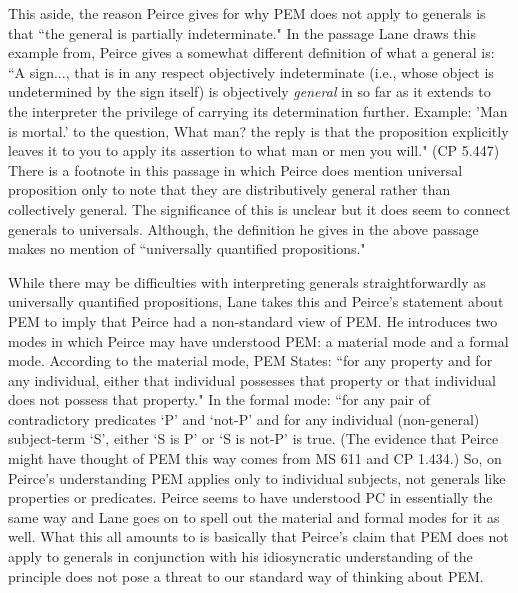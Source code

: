 \documentclass[12pt]{article}
\begin{document}
This aside, the reason Peirce gives for why PEM does not apply to generals is that ``the general is partially indeterminate." In the passage Lane draws this example from, Peirce gives a somewhat different definition of what a general is: ``A sign..., that is in any respect objectively indeterminate (i.e., whose object is undetermined by the sign itself) is objectively \textit{general} in so far as it extends to the interpreter the privilege of carrying its determination further. Example: 'Man is mortal.' to the question, What man? the reply is that the proposition explicitly leaves it to you to apply its assertion to what man or men you will." (CP 5.447) There is a footnote in this passage in which Peirce does mention universal proposition only to note that they are distributively general rather than collectively general. The significance of this is unclear but it does seem to connect generals to universals. Although, the definition he gives in the above passage makes no mention of ``universally quantified propositions." 

While there may be difficulties with interpreting generals straightforwardly as universally quantified propositions, Lane takes this and Peirce's statement about PEM to imply that Peirce had a non-standard view of PEM. He introduces two modes in which Peirce may have understood PEM: a material mode and a formal mode. According to the material mode, PEM States: ``for any property and for any individual, either that individual possesses that property or that individual does not possess that property." In the formal mode: ``for any pair of contradictory predicates `P' and `not-P' and for any individual (non-general) subject-term `S', either `S is P' or `S is not-P' is true. (The evidence that Peirce might have thought of PEM this way comes from MS 611 and CP 1.434.) So, on Peirce's understanding PEM applies only to individual subjects, not generals like properties or predicates. Peirce seems to have understood PC in essentially the same way and Lane goes on to spell out the material and formal modes for it as well. What this all amounts to is basically that Peirce's claim that PEM does not apply to generals in conjunction with his idiosyncratic understanding of the principle does not pose a threat to our standard way of thinking about PEM.
\end{document}
